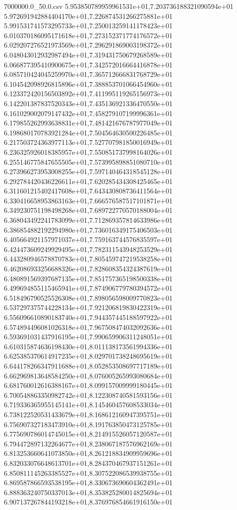 \begin{filecontents*}{7000000.0_50.0.csv}
5.953850789959961531e+01,7.203736188321090594e+01
5.972691942884404170e+01,7.226874531266275881e+01
5.991531741573295733e+01,7.250013259141178423e+01
6.010370186095171618e+01,7.273152371774176572e+01
6.029207276521973569e+01,7.296291869003198372e+01
6.048043012932987494e+01,7.319431750679268589e+01
6.066877395410900675e+01,7.342572016664416878e+01
6.085710424045259970e+01,7.365712666831768729e+01
6.104542098926815896e+01,7.388853701066454960e+01
6.123372420156503892e+01,7.411995119265156973e+01
6.142201387837520343e+01,7.435136921336470550e+01
6.161029002079147432e+01,7.458279107199996361e+01
6.179855262993638831e+01,7.481421676787977049e+01
6.198680170783921284e+01,7.504564630500226485e+01
6.217503724363977113e+01,7.527707981850016949e+01
6.236325926018385957e+01,7.550851737998164026e+01
6.255146775847655505e+01,7.573995898851080710e+01
6.273966273953008255e+01,7.597140464318545128e+01
6.292784420436226611e+01,7.620285434308425465e+01
6.311601215402417608e+01,7.643430808736411564e+01
6.330416658953863163e+01,7.666576587517101871e+01
6.349230751198498268e+01,7.689722770570188004e+01
6.368043492241783099e+01,7.712869357814633986e+01
6.386854882192294980e+01,7.736016349175406503e+01
6.405664921157971037e+01,7.759163744576835597e+01
6.424473609249929495e+01,7.782311543948253529e+01
6.443280946578870783e+01,7.805459747219538258e+01
6.462086933256688326e+01,7.828608354324387619e+01
6.480891569397687135e+01,7.851757365198500338e+01
6.499694855115465941e+01,7.874906779780394572e+01
6.518496790525526308e+01,7.898056598009770823e+01
6.537297375744228134e+01,7.921206819830422319e+01
6.556096610890183740e+01,7.944357445188597922e+01
6.574894496081026318e+01,7.967508474032092636e+01
6.593691031437916195e+01,7.990659906311248051e+01
6.610315874636198430e+01,8.011138173561994336e+01
6.625385370614917235e+01,8.029701738248695619e+01
6.644178266347911688e+01,8.052853508697717189e+01
6.662969813648584250e+01,8.076005265993080684e+01
6.681760012616388167e+01,8.099157009999180445e+01
6.700548863350982742e+01,8.122308740581593156e+01
6.719336365955145141e+01,8.145460457608533034e+01
6.738122520531433679e+01,8.168612160947395751e+01
6.756907327183473910e+01,8.191763850473125785e+01
6.775690786014745015e+01,8.214915526057120587e+01
6.794472897132264677e+01,8.238067187576962169e+01
6.813253660641073850e+01,8.261218834909959696e+01
6.832033076648613701e+01,8.284370467937151261e+01
6.850811145263385527e+01,8.307522086539938755e+01
6.869587866593538195e+01,8.330673690604362491e+01
6.888363240750337013e+01,8.353825280014825694e+01
6.907137267844193218e+01,8.376976854661916150e+01

\end{filecontents*}
